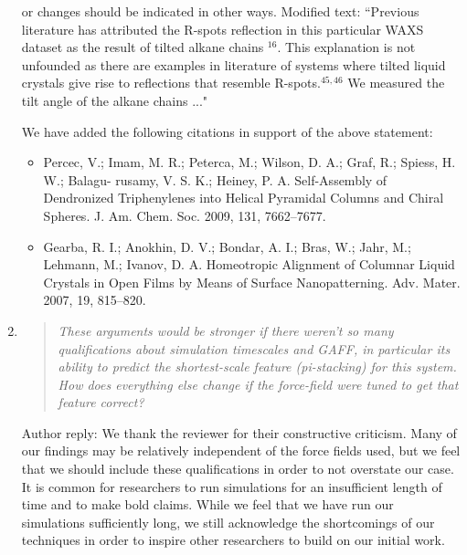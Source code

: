 \documentclass{article}
\begin{document}
\begin{enumerate}
    or changes should be indicated in other ways.  
    Modified text: ``Previous literature has attributed the R-spots reflection
    in this particular WAXS dataset as the result of tilted alkane
    chains $^{16}$. {\color{red} This explanation is not  %
    unfounded as there are examples in literature of systems where tilted liquid
    crystals give rise to reflections that resemble R-spots.$^{45,46}$} We
    measured the tilt angle of the alkane chains ..."
    
    We have added the following citations in support of the above statement:
    \begin{itemize}
    
    \item Percec, V.; Imam, M. R.; Peterca, M.; Wilson, D. A.; Graf, R.; Spiess, H. W.; Balagu-
    rusamy, V. S. K.; Heiney, P. A. Self-Assembly of Dendronized Triphenylenes into Helical
    Pyramidal Columns and Chiral Spheres. J. Am. Chem. Soc. 2009, 131, 7662–7677.

    \item Gearba, R. I.; Anokhin, D. V.; Bondar, A. I.; Bras, W.; Jahr, M.; Lehmann, M.;
    Ivanov, D. A. Homeotropic Alignment of Columnar Liquid Crystals in Open Films by
    Means of Surface Nanopatterning. Adv. Mater. 2007, 19, 815–820.
    
    \end{itemize}

    \item \begin{quote}
    \textit{These arguments would be stronger if there weren't so many
	    qualifications about simulation timescales and GAFF, in particular its ability
	    to predict the shortest-scale feature (pi-stacking) for this system. How does
	    everything else change if the force-field were tuned to get that feature
	    correct?}
    \end{quote}

    Author reply: We thank the reviewer for their constructive criticism. Many
    of our findings may be relatively independent of the force fields used, but we
    feel that we should include these qualifications in order to not overstate our
    case. It is common for researchers to run simulations for an insufficient
    length of time and to make bold claims. While we feel that we have run our 
    simulations sufficiently long, we still acknowledge the shortcomings of our
    techniques in order to inspire other researchers to build on our initial work. 


\end{enumerate}
\end{document}
